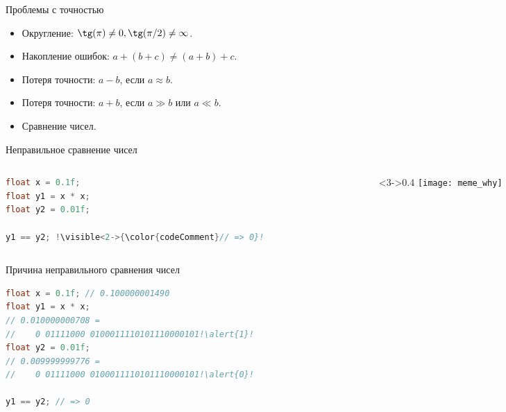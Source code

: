 \begin{frame}{Проблемы с точностью}

  \begin{itemize}
    \item Округление: $\tg(\pi) \neq 0, \tg(\pi/2) \neq \infty$.
    \item Накопление ошибок:
      $a + (b + c) \neq (a + b) + c$.
    \item Потеря точности:
      $a - b$, если $a \approx b$.
    \item Потеря точности:
      $a + b$, если $a \gg b$ или $a \ll b$.
    \item Сравнение чисел.
  \end{itemize}

\end{frame}

\begin{frame}[fragile]{Неправильное сравнение чисел}

  \begin{columns}[onlytextwidth,c]
    \begin{column}{0.6\textwidth}
      \begin{lstlisting}[language=C,escapechar=\!]
float x = 0.1f;
float y1 = x * x;
float y2 = 0.01f;

y1 == y2; !\visible<2->{\color{codeComment}// => 0}!
      \end{lstlisting}
    \end{column}

    \begin{column}<3->{0.4\textwidth}
      \texttt{[image: meme\_why]}
    \end{column}

  \end{columns}

\end{frame}

\begin{frame}[fragile]{Причина неправильного сравнения чисел}

  \begin{lstlisting}[language=C,escapechar=\!]
float x = 0.1f; // 0.100000001490
float y1 = x * x;
// 0.010000000708 =
//    0 01111000 0100011110101110000101!\alert{1}!
float y2 = 0.01f;
// 0.009999999776 =
//    0 01111000 0100011110101110000101!\alert{0}!

y1 == y2; // => 0
  \end{lstlisting}

\end{frame}

